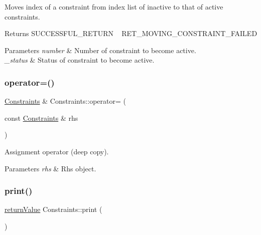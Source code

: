 Moves index of a constraint from index list of inactive to that of active constraints. \begin{DoxyReturn}{Returns}
S\+U\+C\+C\+E\+S\+S\+F\+U\+L\+\_\+\+R\+E\+T\+U\+RN ~\newline
 R\+E\+T\+\_\+\+M\+O\+V\+I\+N\+G\+\_\+\+C\+O\+N\+S\+T\+R\+A\+I\+N\+T\+\_\+\+F\+A\+I\+L\+ED 
\end{DoxyReturn}

\begin{DoxyParams}{Parameters}
{\em number} & Number of constraint to become active. \\
\hline
{\em \+\_\+status} & Status of constraint to become active. \\
\hline
\end{DoxyParams}
\mbox{\label{class_constraints_add013b3e2480cf830eef39123e7afd6e}} 
\subsubsection{\texorpdfstring{operator=()}{operator=()}}
{\footnotesize\ttfamily \hyperlink{class_constraints}{Constraints} \& Constraints\+::operator= (\begin{DoxyParamCaption}\item[{const \hyperlink{class_constraints}{Constraints} \&}]{rhs }\end{DoxyParamCaption})}

Assignment operator (deep copy). 
\begin{DoxyParams}{Parameters}
{\em rhs} & Rhs object. \\
\hline
\end{DoxyParams}
\mbox{\label{class_constraints_abf7172e93fd13af99c76ec8f822b921e}} 
\subsubsection{\texorpdfstring{print()}{print()}}
{\footnotesize\ttfamily \hyperlink{_message_handling_8hpp_a81d556f613bfbabd0b1f9488c0fa865e}{return\+Value} Constraints\+::print (\begin{DoxyParamCaption}{ }\end{DoxyParamCaption})}

